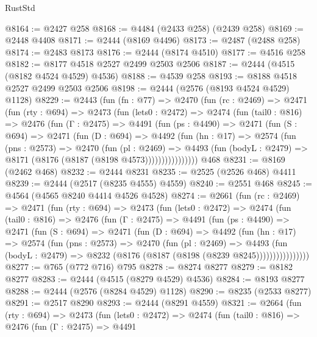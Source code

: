 \begin{lexlean}{RustStd}
\begin{coremodule}
@8164 := @2427 @258
@8168 := @4484 (@2433 @258) (@2439 @258)
@8169 := @2448 @4408
@8171 := @2444 (@8169 @4496)
@8173 := @2487 (@2488 @258)
@8174 := @2483 @8173
@8176 := @2444 (@8174 @4510)
@8177 := @4516 @258
@8182 := @8177 @4518 @2527 @2499 @2503 @2506
@8187 := @2444 (@4515 (@8182 @4524 @4529) @4536)
@8188 := @4539 @258
@8193 := @8188 @4518 @2527 @2499 @2503 @2506
@8198 := @2444 (@2576 (@8193 @4524 @4529) @1128)
@8229 := @2443
    (fun (fn : @77) =>
    @2470
      (fun (rc : @2469) =>
      @2471
        (fun (rty : @694) =>
        @2473
          (fun (lets0 : @2472) =>
          @2474
            (fun (tail0 : @816) =>
            @2476
              (fun (Γ : @2475) =>
              @4491
                (fun (ps : @4490) =>
                @2471
                  (fun (S : @694) =>
                  @2471
                    (fun (D : @694) =>
                    @4492
                      (fun (hn : @17) =>
                      @2574
                        (fun (pns : @2573) =>
                        @2470
                          (fun (pl : @2469) =>
                          @4493
                            (fun (bodyL : @2479) => @8171 (@8176 (@8187 (@8198 @4573))))))))))))))))
    @468
@8231 := @8169 (@2462 @468)
@8232 := @2444 @8231
@8235 := @2525 (@2526 @468) @4411
@8239 := @2444 (@2517 (@8235 @4555) @4559)
@8240 := @2551 @468
@8245 := @4564 (@4565 @8240 @4414 @4526 @4528)
@8274 := @2661
    (fun (rc : @2469) =>
    @2471
      (fun (rty : @694) =>
      @2473
        (fun (lets0 : @2472) =>
        @2474
          (fun (tail0 : @816) =>
          @2476
            (fun (Γ : @2475) =>
            @4491
              (fun (ps : @4490) =>
              @2471
                (fun (S : @694) =>
                @2471
                  (fun (D : @694) =>
                  @4492
                    (fun (hn : @17) =>
                    @2574
                      (fun (pns : @2573) =>
                      @2470
                        (fun (pl : @2469) =>
                        @4493
                          (fun (bodyL : @2479) =>
                          @8232 (@8176 (@8187 (@8198 (@8239 @8245))))))))))))))))
@8277 := @765 (@772 @716) @795
@8278 := @8274 @8277
@8279 := @8182 @8277
@8283 := @2444 (@4515 (@8279 @4529) @4536)
@8284 := @8193 @8277
@8288 := @2444 (@2576 (@8284 @4529) @1128)
@8290 := @8235 (@2533 @8277)
@8291 := @2517 @8290
@8293 := @2444 (@8291 @4559)
@8321 := @2664
    (fun (rty : @694) =>
    @2473
      (fun (lets0 : @2472) =>
      @2474
        (fun (tail0 : @816) =>
        @2476
          (fun (Γ : @2475) =>
          @4491

\end{coremodule}
\end{lexlean}
